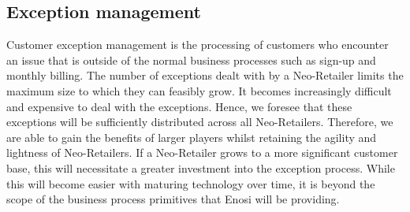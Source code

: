 \documentclass[a4paper,12pt,reqno]{amsart}
\theoremstyle{definition}
\begin{document}
\subsection*{Exception management}

Customer exception management is the processing of customers who encounter an issue that is outside of the normal business processes such as sign-up and monthly billing. The number of exceptions dealt with by a Neo-Retailer limits the maximum size to which they can feasibly grow. 
It becomes increasingly difficult and expensive to deal with the exceptions. Hence, we foresee that these exceptions will be sufficiently distributed across all Neo-Retailers. Therefore, we are able to gain the benefits of larger players whilst retaining the agility and lightness of Neo-Retailers. If a Neo-Retailer grows to a more significant customer base, this will necessitate a greater investment into the exception process. While this will become easier with maturing technology over time, it is beyond the scope of the business process primitives that Enosi will be providing.







\end{document}
